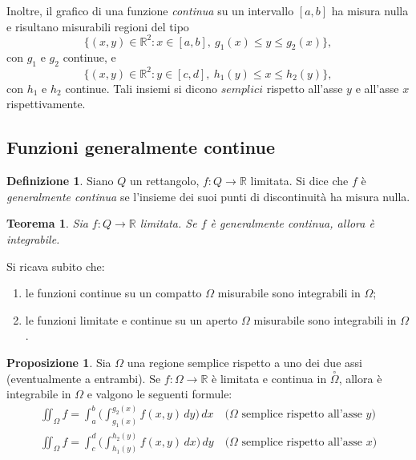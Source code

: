 \documentclass[a4paper]{book}
\numberwithin{equation}{section}
\theoremstyle{plain}
\newtheorem{teor}{Teorema}[section]
\theoremstyle{definition}
\newtheorem{defn}{Definizione}[section]
\newtheorem{prop}{Proposizione}[section]
\theoremstyle{remark}
\theoremstyle{example}
\begin{document}
Inoltre, il grafico di una funzione \emph{continua} su un intervallo $[a, b]$ ha misura nulla e risultano misurabili regioni del tipo
	\begin{equation}
	\{(x,y) \in \mathbb{R}^2  \colon x \in [a, b], \ g_1 (x) \le y \le g_2(x)\},
	\end{equation}
con $g_1$ e $g_2$ continue, e
	\begin{equation}
	\{(x,y) \in \mathbb{R}^2 \colon y \in [c,d], \ h_1(y) \le x \le h_2(y) \},
	\end{equation}
con $h_1$ e $h_2$ continue. Tali insiemi si dicono $semplici$ rispetto all'asse $y$ e all'asse $x$ rispettivamente.

\subsection{Funzioni generalmente continue}
\begin{defn}
Siano $Q$ un rettangolo, $f \colon Q \to \mathbb{R}$ limitata. Si dice che $f$ è \emph{generalmente continua} se l'insieme dei suoi punti di discontinuità ha misura nulla.
\end{defn}

\begin{teor}
Sia $f \colon Q \to \mathbb{R}$ limitata. Se $f$ è generalmente continua, allora è integrabile.
\end{teor}

Si ricava subito che:
\begin{enumerate}
\item le funzioni continue su un compatto $\Omega$ misurabile sono integrabili in $\Omega$;
\item le funzioni limitate e continue su un aperto $\Omega$ misurabile sono integrabili in $\Omega$.
\end{enumerate}

\begin{prop}
Sia $\Omega$ una regione semplice rispetto a uno dei due assi (eventualmente a entrambi). Se $f \colon \Omega \to \mathbb{R}$ è limitata e continua in $\overset{\circ}{\Omega}$, allora è integrabile in $\Omega$ e valgono le seguenti formule:
	\begin{align}
	\iint_{\Omega} f = \int_a^b \biggl( \int_{g_1(x)}^{g_2(x)} f(x, y) \, dy \biggr) \, dx \quad \text{($\Omega$ semplice rispetto all'asse $y$)} \\
	\iint_{\Omega} f = \int_c^d \biggl(\int_{h_1(y)}^{h_2(y)} f(x,y) \, dx \biggr) \, dy \quad \text{($\Omega$ semplice rispetto all'asse $x$)}
	\end{align}
\end{prop}
\end{document}
